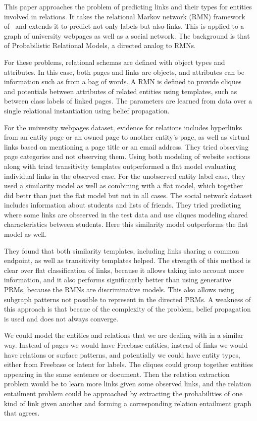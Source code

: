 \documentclass{article}
\begin{document}
This paper approaches the problem of predicting links and their types for entities involved in relations. It takes the relational Markov network (RMN) framework of~\cite{Taskar:2002:DPM:2073876.2073934} and extends it to predict not only labels but also links. This is applied to a graph of university webpages as well as a social network. The background is that of Probabilistic Relational Models, a directed analog to RMNs.

For these problems, relational schemas are defined with object types and attributes. In this case, both pages and links are objects, and attributes can be information such as from a bag of words. A RMN is defined to provide cliques and potentials between attributes of related entities using templates, such as between class labels of linked pages. The parameters are learned from data over a single relational instantiation using belief propagation.

For the university webpages dataset, evidence for relations includes hyperlinks from an entity page or an owned page to another entity's page, as well as virtual links based on mentioning a page title or an email address. They tried observing page categories and not observing them. Using both modeling of website sections along with triad transitivity templates outperformed a flat model evaluating individual links in the observed case. For the unobserved entity label case, they used a similarity model as well as combining with a flat model, which together did bettr than just the flat model but not in all cases. The social network dataset includes information about students and lists of friends. They tried predicting where some links are obseerved in the test data and use cliques modeling shared characteristics between students. Here this similarity model outperforms the flat model as well.

They found that both similarity templates, including links sharing a common endpoint, as well as transitivity templates helped. The strength of this method is clear over flat classification of links, because it allows taking into account more information, and it also performs significantly better than using generative PRMs, because the RMNs are discriminative models. This also allows using subgraph patterns not possible to represent in the directed PRMs. A weakness of this approach is that becaue of the complexity of the problem, belief propagation is used and does not always converge.

We could model the entities and relations that we are dealing with in a similar way. Instead of pages we would have Freebase entities, instead of links we would have relations or surface patterns, and potentially we could have entity types, either from Freebase or latent for labels. The cliques could group together entities appearing in the same sentence or document. Then the relation extraction problem would be to learn more links given some observed links, and the relation entailment problem could be approached by extracting the probabilities of one kind of link given another and forming a corresponding relation entailment graph that agrees.



\end{document}
